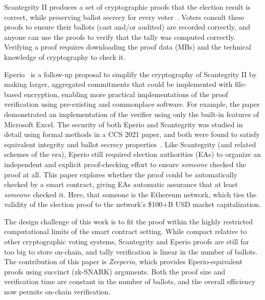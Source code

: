Scantegrity II produces a set of cryptographic proofs that the election result is correct, while preserving ballot secrecy for every voter~\cite{KTV10c,BDGR21}. Voters consult these proofs to ensure their ballots (cast and/or audited) are recorded correctly, and anyone can use the proofs to verify that the tally was computed correctly. Verifying a proof requires downloading the proof data (MBs) and the technical knowledge of cryptography to check it.

Eperio~\cite{ECHA10} is a follow-up proposal to simplify the cryptography of Scantegrity II by making larger, aggregated commitments that could be implemented with file-based encryption, enabling more practical implementations of the proof verification using pre-existing and commonplace software. 
For example, the paper demonstrated an implementation of the verifier using only the built-in features of Microsoft Excel. 
The security of both Eperio and Scantegrity was studied in detail using formal methods in a CCS 2021 paper, and both were found to satisfy equivalent integrity and ballot secrecy properties~\cite{BDGR21}. 
Like Scantegrity (and related schemes of the era), Eperio still required election authorities (EAs) to organize an independent and explicit proof-checking effort to ensure {\em someone} checked the proof at all. This paper explores whether the proof could be automatically checked by a smart contract, giving EAs automatic assurance that at least {\em someone} checked it. Here, that someone is the Ethereum network, which ties the validity of the election proof to the network's \$100+B USD market capitalization. 

The design challenge of this work is to fit the proof within the highly restricted computational limits of the smart contract setting. While compact relative to other cryptographic voting systems, Scantegrity and Eperio proofs are still far too big to store on-chain, and tally verification is linear in the number of ballots. The contribution of this paper is {\em Zeeperio}, which provides Eperio-equivalent proofs using succinct (zk-SNARK) arguments. Both the proof size and verification time are constant in the number of ballots, and the overall efficiency now permits on-chain verification. 




